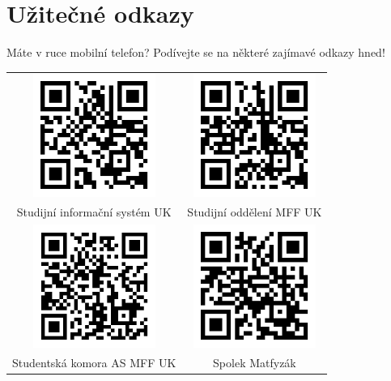 \section*{Užitečné odkazy}
Máte v ruce mobilní telefon? Podívejte se na některé zajímavé odkazy hned!


\begin{tabular}{cc}
    \includegraphics[width=4cm]{QR/is.png}&
    \includegraphics[width=4cm]{QR/studijni.png} \\
    Studijní informační systém UK&
    Studijní oddělení MFF UK \\
    
    \includegraphics[width=4cm]{QR/skas.png}&
    \includegraphics[width=4cm]{QR/matfyzak.png} \\
    Studentská komora AS MFF UK &
    Spolek Matfyzák \\


\end{tabular}

